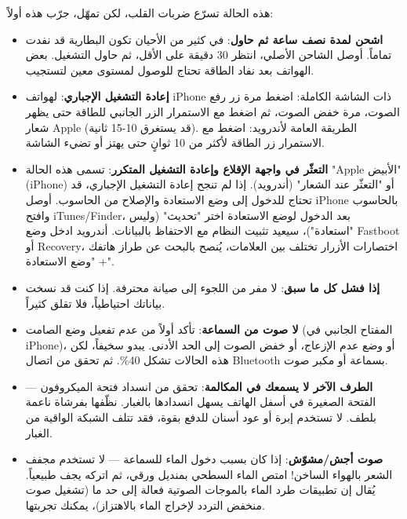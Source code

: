 
هذه الحالة تسرّع ضربات القلب، لكن تمهّل، جرّب هذه أولاً:

\begin{itemize}
  \item \textbf{اشحن لمدة نصف ساعة ثم حاول}: في كثير من الأحيان تكون البطارية قد نفدت تماماً. أوصل الشاحن الأصلي، انتظر 30 دقيقة على الأقل، ثم حاول التشغيل. بعض الهواتف بعد نفاد الطاقة تحتاج للوصول لمستوى معين لتستجيب.
  \item \textbf{إعادة التشغيل الإجباري}: لهواتف iPhone ذات الشاشة الكاملة: اضغط مرة زر رفع الصوت، مرة خفض الصوت، ثم اضغط مع الاستمرار الزر الجانبي للطاقة حتى يظهر شعار Apple (قد يستغرق 10-15 ثانية). الطريقة العامة لأندرويد: اضغط مع الاستمرار زر الطاقة لأكثر من 10 ثوانٍ حتى يهتز أو تضيء الشاشة.
  \item \textbf{التعثّر في واجهة الإقلاع وإعادة التشغيل المتكرر}: تسمى هذه الحالة "Apple الأبيض" (iPhone) أو "التعثّر عند الشعار" (أندرويد). إذا لم تنجح إعادة التشغيل الإجباري، قد تحتاج للدخول إلى وضع الاستعادة والإصلاح من الحاسوب. أوصل iPhone بالحاسوب وافتح iTunes/Finder، بعد الدخول لوضع الاستعادة اختر "تحديث" (وليس "استعادة")، سيعيد تثبيت النظام مع الاحتفاظ بالبيانات. أندرويد ادخل وضع Fastboot أو Recovery، اختصارات الأزرار تختلف بين العلامات، يُنصح بالبحث عن طراز هاتفك + "وضع الاستعادة".
  \item \textbf{إذا فشل كل ما سبق}: لا مفر من اللجوء إلى صيانة محترفة. إذا كنت قد نسخت بياناتك احتياطياً، فلا تقلق كثيراً.
\end{itemize}


\begin{itemize}
  \item \textbf{لا صوت من السماعة}: تأكد أولاً من عدم تفعيل وضع الصامت (المفتاح الجانبي في iPhone)، أو وضع عدم الإزعاج، أو خفض الصوت إلى الحد الأدنى. يبدو سخيفاً، لكن هذه الحالات تشكل 40\%. ثم تحقق من اتصال Bluetooth بسماعة أو مكبر صوت.
  \item \textbf{الطرف الآخر لا يسمعك في المكالمة}: تحقق من انسداد فتحة الميكروفون — الفتحة الصغيرة في أسفل الهاتف يسهل انسدادها بالغبار. نظّفها بفرشاة ناعمة بلطف. لا تستخدم إبرة أو عود أسنان للدفع بقوة، فقد تتلف الشبكة الواقية من الغبار.
  \item \textbf{صوت أجش/مشوّش}: إذا كان بسبب دخول الماء للسماعة — لا تستخدم مجفف الشعر بالهواء الساخن! امتص الماء السطحي بمنديل ورقي، ثم اتركه يجف طبيعياً. يُقال إن تطبيقات طرد الماء بالموجات الصوتية فعالة إلى حد ما (تشغيل صوت منخفض التردد لإخراج الماء بالاهتزاز)، يمكنك تجربتها.
\end{itemize}


